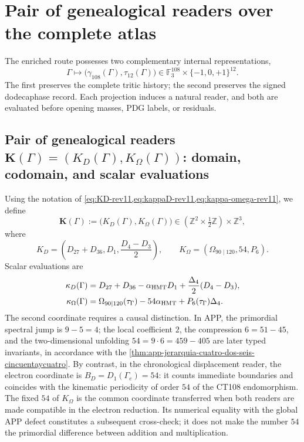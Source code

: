 \section{Pair of genealogical readers over the complete atlas}
\label{sec:operadores-masa-two-way-rev11}

The enriched route possesses two complementary internal representations,
\[
 \Gamma\longmapsto
 \bigl(\gamma_{108}(\Gamma),\tau_{12}(\Gamma)\bigr)
 \in\mathbb F_3^{108}\times\{-1,0,+1\}^{12}.
\]
The first preserves the complete tritic history; the second preserves the
signed dodecaphase record. Each projection induces a natural reader, and both
are evaluated before opening masses, PDG labels, or residuals.

\subsection{Pair of genealogical readers \(\mathbf K(\Gamma)=(K_D(\Gamma),K_\Omega(\Gamma))\): domain, codomain, and scalar evaluations}

Using the notation of
\cref{eq:KD-rev11,eq:kappaD-rev11,eq:kappa-omega-rev11}, we define
\begin{equation}
 \mathbf K(\Gamma)
 :=\bigl(K_D(\Gamma),K_\Omega(\Gamma)\bigr)
 \in\left(\mathbb Z^2\times\tfrac12\mathbb Z\right)
 \times\mathbb Z^3,
 \label{eq:lector-conjunto-masas-rev11}
\end{equation}
where
\[
 K_D=\left(D_{27}+D_{36},D_1,\frac{D_4-D_3}{2}\right),
 \qquad
 K_\Omega=(\Omega_{90\mid120},54,P_6).
\]
Scalar evaluations are
\begin{align}
 \kappa_D(\Gamma)
 &=D_{27}+D_{36}-\alpha_{\rm HMT}D_1
 +\frac{\Delta_4}{2}(D_4-D_3),
 \label{eq:kappaD-general-rev11}\\
\kappa_\Omega(\Gamma)
&=\Omega_{90\mid120}(\tau_\Gamma)
-54\alpha_{\rm HMT}+P_6(\tau_\Gamma)\Delta_4.
\label{eq:kappaOmega-general-rev11}
\end{align}
The second coordinate requires a causal distinction. In APP, the primordial spectral jump is \(9-5=4\); the local coefficient \(2\), the compression \(6=51-45\), and the two-dimensional unfolding \(54=9\cdot6=459-405\) are later typed invariants, in accordance with the \cref{thm:app-jerarquia-cuatro-dos-seis-cincuentaycuatro}. By contrast, in the chronological displacement reader, the electron coordinate is \(B_D=D_1(\Gamma_e)=54\): it counts immediate boundaries and coincides with the kinematic periodicity of order \(54\) of the CT108 endomorphism. The fixed \(54\) of \(K_\Omega\) is the common coordinate transferred when both readers are made compatible in the electron reduction. Its numerical equality with the global APP defect constitutes a subsequent cross-check; it does not make the number \(54\) the primordial difference between addition and multiplication.

